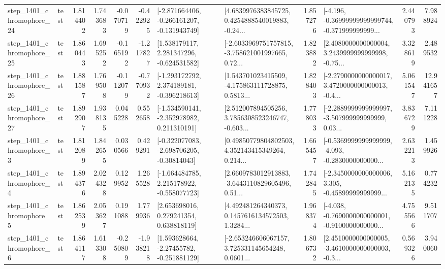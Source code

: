 \begin{tabular}{llrrrrllrlrr}
 step\_1401\_chromophore\_24 &      test &      1.814402 &    1.743683 &     -0.070719 & -0.422925 &  [-2.871664406, -0.266161207, -0.131943749] &  [4.6839976383845725, 0.4254888540019883, -0.24... &       1.857276 &  [-4.196, -0.36999999999999744, -0.371999999999... &            2.440793 &          7.988924 \\
 step\_1401\_chromophore\_25 &      test &      1.860443 &    1.695252 &     -0.165192 & -1.217827 &    [1.538179117, 2.281347296, -0.624531582] &  [-2.6033969751757815, -3.758621001997665, 0.72... &       1.823882 &  [2.4080000000000004, 3.2439999999999998, -0.75... &            3.328619 &          2.489532 \\
 step\_1401\_chromophore\_26 &      test &      1.881587 &    1.769508 &     -0.112079 & -0.770932 &   [-1.293172792, 2.374189181, -0.396218613] &  [1.543701023415509, -4.175863111728875, 0.5813... &       1.828403 &  [-2.2790000000000017, 3.4720000000000013, -0.4... &            5.061547 &         12.941657 \\
 step\_1401\_chromophore\_27 &      test &      1.892907 &    1.938135 &      0.045228 &  0.552658 &   [-1.534590141, -2.352978982, 0.211310191] &  [2.512007894505256, 3.7856308523246747, -0.603... &       1.778033 &  [-2.2889999999999997, -3.507999999999999, 0.03... &            3.836729 &          7.111228 \\
  step\_1401\_chromophore\_3 &      test &      1.812089 &    1.842655 &      0.030566 &  0.429291 &   [-0.322077083, -2.698706205, -0.30814043] &  [0.49850779804802503, 4.352143415349264, 0.214... &       1.665457 &  [-0.5369999999999999, -4.093, -0.2830000000000... &            2.632213 &          1.459926 \\
  step\_1401\_chromophore\_4 &      test &      1.894376 &    2.024328 &      0.129952 &  1.265528 &   [-1.664484785, 2.215178922, -0.558077723] &  [2.6609783012913883, -3.6443110829605496, 0.51... &       1.742845 &  [-2.3450000000000006, 3.305, -0.45899999999999... &            5.162135 &          0.774232 \\
  step\_1401\_chromophore\_5 &      test &      1.862539 &    2.053627 &      0.191088 &  1.779936 &     [2.653698016, 0.279241354, 0.638818119] &  [4.492481264340373, 0.1457616134572503, 1.3284... &       1.968374 &  [-4.038, -0.7690000000000001, -0.9100000000000... &            4.755566 &          9.511707 \\
  step\_1401\_chromophore\_6 &      test &      1.864117 &    1.613308 &     -0.250809 & -1.938218 &    [1.593628664, -2.27455782, -0.251881129] &  [-2.653246606067157, 3.725331145654248, 0.0601... &       1.806732 &  [2.4510000000000005, -3.4610000000000003, -0.3... &            0.569326 &          3.940060 \\

\end{tabular}
